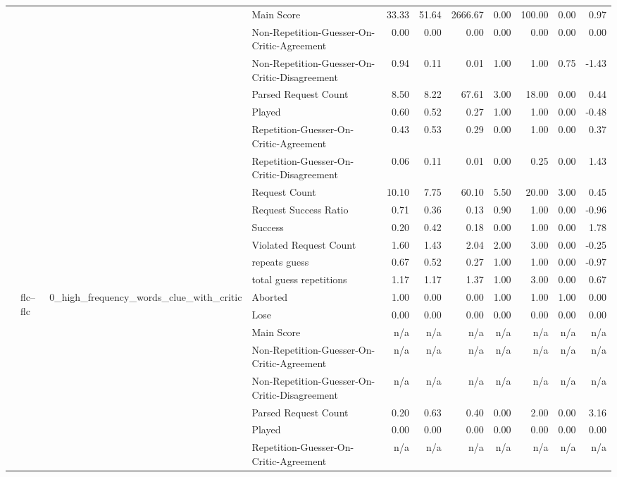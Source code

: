 \begin{tabular}{llllrrrrrrr}
 &  &  & Main Score & 33.33 & 51.64 & 2666.67 & 0.00 & 100.00 & 0.00 & 0.97 \\
 &  &  & Non-Repetition-Guesser-On-Critic-Agreement & 0.00 & 0.00 & 0.00 & 0.00 & 0.00 & 0.00 & 0.00 \\
 &  &  & Non-Repetition-Guesser-On-Critic-Disagreement & 0.94 & 0.11 & 0.01 & 1.00 & 1.00 & 0.75 & -1.43 \\
 &  &  & Parsed Request Count & 8.50 & 8.22 & 67.61 & 3.00 & 18.00 & 0.00 & 0.44 \\
 &  &  & Played & 0.60 & 0.52 & 0.27 & 1.00 & 1.00 & 0.00 & -0.48 \\
 &  &  & Repetition-Guesser-On-Critic-Agreement & 0.43 & 0.53 & 0.29 & 0.00 & 1.00 & 0.00 & 0.37 \\
 &  &  & Repetition-Guesser-On-Critic-Disagreement & 0.06 & 0.11 & 0.01 & 0.00 & 0.25 & 0.00 & 1.43 \\
 &  &  & Request Count & 10.10 & 7.75 & 60.10 & 5.50 & 20.00 & 3.00 & 0.45 \\
 &  &  & Request Success Ratio & 0.71 & 0.36 & 0.13 & 0.90 & 1.00 & 0.00 & -0.96 \\
 &  &  & Success & 0.20 & 0.42 & 0.18 & 0.00 & 1.00 & 0.00 & 1.78 \\
 &  &  & Violated Request Count & 1.60 & 1.43 & 2.04 & 2.00 & 3.00 & 0.00 & -0.25 \\
 &  &  & repeats guess & 0.67 & 0.52 & 0.27 & 1.00 & 1.00 & 0.00 & -0.97 \\
 &  &  & total guess repetitions & 1.17 & 1.17 & 1.37 & 1.00 & 3.00 & 0.00 & 0.67 \\
\cline{2-11} \cline{3-11}
 & \multirow[t]{45}{*}{flc--flc} & \multirow[t]{15}{*}{0_high_frequency_words_clue_with_critic} & Aborted & 1.00 & 0.00 & 0.00 & 1.00 & 1.00 & 1.00 & 0.00 \\
 &  &  & Lose & 0.00 & 0.00 & 0.00 & 0.00 & 0.00 & 0.00 & 0.00 \\
 &  &  & Main Score & n/a & n/a & n/a & n/a & n/a & n/a & n/a \\
 &  &  & Non-Repetition-Guesser-On-Critic-Agreement & n/a & n/a & n/a & n/a & n/a & n/a & n/a \\
 &  &  & Non-Repetition-Guesser-On-Critic-Disagreement & n/a & n/a & n/a & n/a & n/a & n/a & n/a \\
 &  &  & Parsed Request Count & 0.20 & 0.63 & 0.40 & 0.00 & 2.00 & 0.00 & 3.16 \\
 &  &  & Played & 0.00 & 0.00 & 0.00 & 0.00 & 0.00 & 0.00 & 0.00 \\
 &  &  & Repetition-Guesser-On-Critic-Agreement & n/a & n/a & n/a & n/a & n/a & n/a & n/a \\

\end{tabular}
